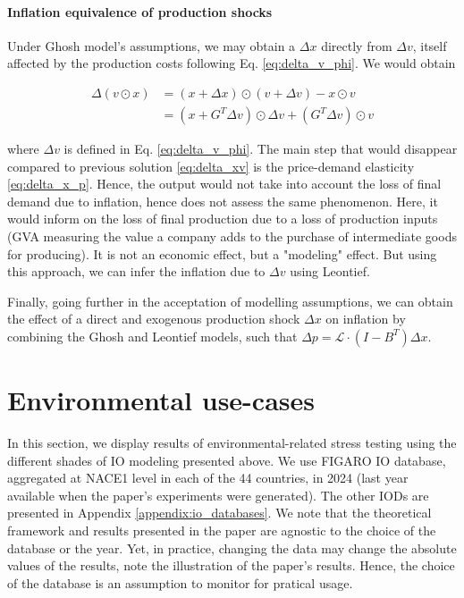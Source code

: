 \documentclass{article}
\begin{document}
\paragraph{Inflation equivalence of production shocks}
Under Ghosh model's assumptions, we may obtain a $\Delta x$ directly from $\Delta v$, itself affected by the production costs following Eq. \eqref{eq:delta_v_phi}. We would obtain

\begin{align*}
	\Delta (v \odot x) & = (x + \Delta x) \odot (v + \Delta v) - x \odot v 
	\\
	& = (x + G^T \Delta v) \odot \Delta v + (G^T \Delta v) \odot v 
\end{align*}
	
\noindent where $\Delta v$ is defined in Eq. \eqref{eq:delta_v_phi}. The main step that would disappear compared to previous solution \eqref{eq:delta_xv} is the price-demand elasticity \eqref{eq:delta_x_p}. Hence, the output would not take into account the loss of final demand due to inflation, hence does not assess the same phenomenon. Here, it would inform on the loss of final production due to a loss of production inputs (GVA measuring the value a company adds to the purchase of intermediate goods for producing). It is not an economic effect, but a "modeling" effect. But using this approach, we can infer the inflation due to $\Delta v$ using Leontief. 

\vspace{0.1cm}

Finally, going further in the acceptation of modelling assumptions, we can obtain the effect of a direct and exogenous production shock $\Delta x$ on inflation by combining the Ghosh and Leontief models, such that $\Delta p = \mathcal{L} \cdot (I - B^T) \Delta x$. 


\section{Environmental use-cases}
\label{sec:use_cases}

In this section, we display results of environmental-related stress testing using the different shades of IO modeling presented above. We use FIGARO IO database, aggregated at NACE1 level in each of the 44 countries, in 2024 (last year available when the paper's experiments were generated). The other IODs are presented in Appendix \ref{appendix:io_databases}.  We note that the theoretical framework and results presented in the paper are agnostic to the choice of the database or the year. Yet, in practice, changing the data may change the absolute values of the results, note the illustration of the paper's results. Hence, the choice of the database is an assumption to monitor for pratical usage. 
\end{document}
